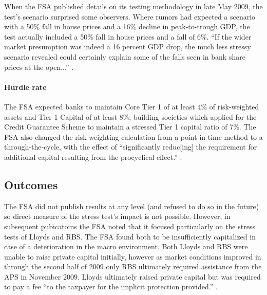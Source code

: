 \documentclass[12pt]{article}
\begin{document}
When the FSA published details on its testing methodology in late May 2009, the test's scenario surprised some observers. Where rumors had expected a scenario with a 50\% fall in house prices and a 16\% decline in peak-to-trough GDP, the test actually included a 50\% fall in house prices and a fall of 6\%. ``If the wider market presumption was indeed a 16 percent GDP drop, the much less stressy scenario revealed could certainly explain some of the falls seen in bank share prices at the open...'' \citep{Stressy}. 

\paragraph{Hurdle rate}

The FSA expected banks to maintain Core Tier 1 of at least 4\% of risk-weighted assets and Tier 1 Capital of at least 8\%; building societies which applied for the Credit Guarantee Scheme to maintain a stressed Tier 1 capital ratio of 7\%. \citep{Results} The FSA also changed the risk weighting calculation from a point-in-time method to a through-the-cycle, with the effect of ``significantly reduc[ing] the requirement for additional capital resulting from the procyclical effect.'' \citep{Jan2009}.

\subsection{Outcomes}

The FSA did not publish results at any level (and refused to do so in the future) so direct measure of the stress test's impact is not possible. However, in subsequent pubicatoins the FSA noted that it focused particularly on the stress tests of Lloyds and RBS. The FSA found both to be insufficiently capitalized in case of a deterioration in the macro environment. Both Lloyds and RBS were unable to raise private capital initially, however as market conditions improved in through the second half of 2009 only RBS ultimately required assistance from the APS in November 2009. Lloyds ultimately raised private capital but was required to pay a fee ``to the taxpayer for the implicit protection provided.'' \citep{FSAReport}.
\end{document}
